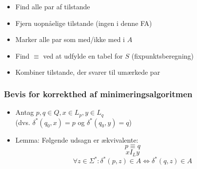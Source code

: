 \documentclass[]{beamer}
\begin{document}
\begin{frame}
\begin{columns}
\column{2.5cm}
\column{3.5cm}
\end{columns}
\begin{itemize}
\item<1-> Find alle par af tilstande
\item<2-> Fjern uopnåelige tilstande (ingen i denne FA)
\item<4-> Marker alle par som med/ikke med i $A$
\item<6-> Find $\equiv$  ved at udfylde en tabel for $S$ (fixpunktsberegning)
\item<8-> Kombiner tilstande, der svarer til umærkede par
\end{itemize}
\end{frame}


\begin{frame}
\frametitle{Bevis for korrekthed af minimeringsalgoritmen}
\begin{itemize}[<+->]
\item Antag $p,q\in Q, x\in L_p, y\in L_q$\\
(dvs. $\delta^*(q_0, x)=p$ og $\delta^*(q_0, y)=q$)
\item
Lemma:  Følgende udsagn er ækvivalente:
\[p \equiv q\]
\[x I_L y\]
\[\forall z\in \Sigma^*:  \delta^*(p, z)\in A  \Leftrightarrow	\delta^*(q, z)\in A\]
\end{itemize}
\end{frame}
\end{document}

